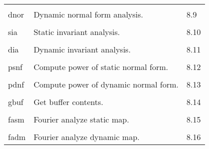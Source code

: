 \begin{center}
\begin{tabular}{lll}
\vspace{-3mm}& &\\
\hspace{1.5em}dnor    &           Dynamic normal form analysis.  &  \hspace{2em}8.9\\
\vspace{-3mm}& &\\
\hspace{1.5em}sia     &           Static invariant analysis.     &  \hspace{2em}8.10\\
\vspace{-3mm}& &\\
\hspace{1.5em}dia     &           Dynamic invariant analysis.    &  \hspace{2em}8.11\\
\vspace{-3mm}& &\\
\hspace{1.5em}psnf    &    Compute power of static normal form.&  \hspace{2em}8.12\\
\vspace{-3mm}& &\\
\hspace{1.5em}pdnf    &    Compute power of dynamic normal form.&  \hspace{2em}8.13\\
\vspace{-3mm}& &\\
\hspace{1.5em}gbuf    &           Get buffer contents.           &
\hspace{2em}8.14\\
\vspace{-3mm}& &\\
\hspace{1.5em}fasm    &           Fourier analyze static map.    &  \hspace{2em}8.15\\
\vspace{-3mm}& &\\
\hspace{1.5em}fadm    &           Fourier analyze dynamic map.   &  \hspace{2em}8.16
\end{tabular}


\end{center}
